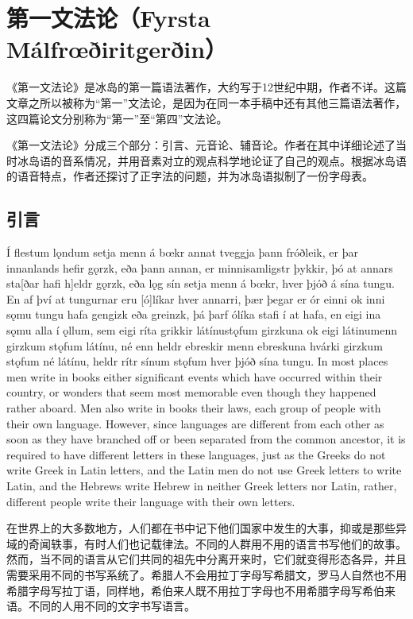 \chapter{第一文法论（Fyrsta Málfrœðiritgerðin）}

《第一文法论》是冰岛的第一篇语法著作，大约写于12世纪中期，作者不详。这篇文章之所以被称为“第一”文法论，是因为在同一本手稿中还有其他三篇语法著作，这四篇论文分别称为“第一”至“第四”文法论。

《第一文法论》分成三个部分：引言\footnotemark、元音论、辅音论。作者在其中详细论述了当时冰岛语的音系情况，并用音素对立的观点科学地论证了自己的观点。根据冰岛语的语音特点，作者还探讨了正字法的问题，并为冰岛语拟制了一份字母表。
\section{引言}
\begin{paracol}{2}
    Í flestum lǫndum setja menn á bœkr annat tveggja þann fróðleik, er þar innanlands hefir gǫrzk, eða þann annan, er minnisamligstr þykkir, þó at annars sta[ðar hafi h]eldr gǫrzk, eða lǫg sín setja menn á bœkr, hver þjóð á sína tungu. En af því at tungurnar eru [ó]líkar hver annarri, þær þegar er ór einni ok inni sǫmu tungu hafa gengizk eða greinzk, þá þarf ólíka stafi í at hafa, en eigi ina sǫmu alla í ǫllum, sem eigi ríta grikkir látínustǫfum girzkuna ok eigi látinumenn girzkum stǫfum látínu, né enn heldr ebreskir menn ebreskuna hvárki girzkum stǫfum né látínu, heldr rítr sínum stǫfum hver þjóð sína tungu.
    \switchcolumn
    In most places men write in books either  significant events which have occurred within their country, or wonders that seem most memorable even though they happened rather aboard. Men also write in books their laws, each group of people with their own language. However, since languages are different from each other as soon as they have branched off or been separated from the common ancestor, it is required to have different letters in these languages, just as the Greeks do not write Greek in Latin letters, and the Latin men do not use Greek letters to write Latin, and the Hebrews write Hebrew in neither Greek letters nor Latin, rather, different people write their language with their own letters.
\end{paracol}
\begin{translation*}{}
    在世界上的大多数地方，人们都在书中记下他们国家中发生的大事，抑或是那些异域的奇闻轶事，有时人们也记载律法。不同的人群用不用的语言书写他们的故事。然而，当不同的语言从它们共同的祖先中分离开来时，它们就变得形态各异，并且需要采用不同的书写系统了。希腊人不会用拉丁字母写希腊文，罗马人自然也不用希腊字母写拉丁语，同样地，希伯来人既不用拉丁字母也不用希腊字母写希伯来语。不同的人用不同的文字书写语言。
\end{translation*}
